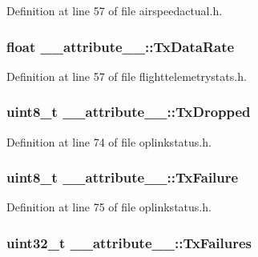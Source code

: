 \-Definition at line 57 of file airspeedactual.\-h.

\hypertarget{struct____attribute_____ae65ec0b799fb39bcc0eb35bfcb38abb2}{
\subsubsection[{\-Tx\-Data\-Rate}]{\setlength{\rightskip}{0pt plus 5cm}float {\bf \-\_\-\-\_\-attribute\-\_\-\-\_\-\-::\-Tx\-Data\-Rate}}}\label{struct____attribute_____ae65ec0b799fb39bcc0eb35bfcb38abb2}


\-Definition at line 57 of file flighttelemetrystats.\-h.

\hypertarget{struct____attribute_____ab2fd1e088c2d7cb16f9be10b60715969}{
\subsubsection[{\-Tx\-Dropped}]{\setlength{\rightskip}{0pt plus 5cm}uint8\-\_\-t {\bf \-\_\-\-\_\-attribute\-\_\-\-\_\-\-::\-Tx\-Dropped}}}\label{struct____attribute_____ab2fd1e088c2d7cb16f9be10b60715969}


\-Definition at line 74 of file oplinkstatus.\-h.

\hypertarget{struct____attribute_____ad56588f1c5d1817112eb3b26476fd931}{
\subsubsection[{\-Tx\-Failure}]{\setlength{\rightskip}{0pt plus 5cm}uint8\-\_\-t {\bf \-\_\-\-\_\-attribute\-\_\-\-\_\-\-::\-Tx\-Failure}}}\label{struct____attribute_____ad56588f1c5d1817112eb3b26476fd931}


\-Definition at line 75 of file oplinkstatus.\-h.

\hypertarget{struct____attribute_____a7e11955ae1b84dd63bb54eddcbd180cc}{
\subsubsection[{\-Tx\-Failures}]{\setlength{\rightskip}{0pt plus 5cm}uint32\-\_\-t {\bf \-\_\-\-\_\-attribute\-\_\-\-\_\-\-::\-Tx\-Failures}}}\label{struct____attribute_____a7e11955ae1b84dd63bb54eddcbd180cc}


